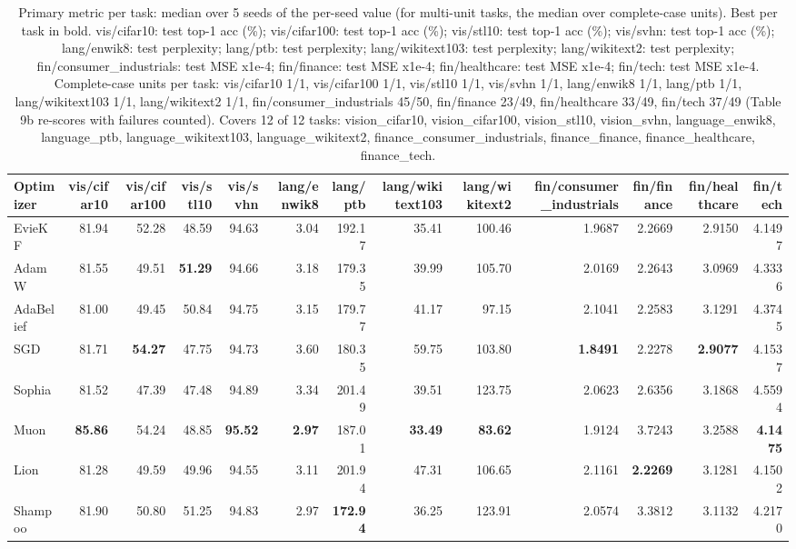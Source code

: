 \begin{table}[t]
\centering
\small
\caption{Primary metric per task: median over 5 seeds of the per-seed value (for multi-unit tasks, the median over complete-case units). Best per task in bold. vis/cifar10: test top-1 acc (\%); vis/cifar100: test top-1 acc (\%); vis/stl10: test top-1 acc (\%); vis/svhn: test top-1 acc (\%); lang/enwik8: test perplexity; lang/ptb: test perplexity; lang/wikitext103: test perplexity; lang/wikitext2: test perplexity; fin/consumer\_industrials: test MSE x1e-4; fin/finance: test MSE x1e-4; fin/healthcare: test MSE x1e-4; fin/tech: test MSE x1e-4. Complete-case units per task: vis/cifar10 1/1, vis/cifar100 1/1, vis/stl10 1/1, vis/svhn 1/1, lang/enwik8 1/1, lang/ptb 1/1, lang/wikitext103 1/1, lang/wikitext2 1/1, fin/consumer\_industrials 45/50, fin/finance 23/49, fin/healthcare 33/49, fin/tech 37/49 (Table 9b re-scores with failures counted). Covers 12 of 12 tasks: vision\_cifar10, vision\_cifar100, vision\_stl10, vision\_svhn, language\_enwik8, language\_ptb, language\_wikitext103, language\_wikitext2, finance\_consumer\_industrials, finance\_finance, finance\_healthcare, finance\_tech.}
\label{tab:table1_main_results}
\begin{tabular}{lrrrrrrrrrrrr}
\toprule
Optimizer & vis/cifar10 & vis/cifar100 & vis/stl10 & vis/svhn & lang/enwik8 & lang/ptb & lang/wikitext103 & lang/wikitext2 & fin/consumer\_industrials & fin/finance & fin/healthcare & fin/tech \\
\midrule
EvieKF & 81.94 & 52.28 & 48.59 & 94.63 & 3.04 & 192.17 & 35.41 & 100.46 & 1.9687 & 2.2669 & 2.9150 & 4.1497 \\
AdamW & 81.55 & 49.51 & \textbf{51.29} & 94.66 & 3.18 & 179.35 & 39.99 & 105.70 & 2.0169 & 2.2643 & 3.0969 & 4.3336 \\
AdaBelief & 81.00 & 49.45 & 50.84 & 94.75 & 3.15 & 179.77 & 41.17 & 97.15 & 2.1041 & 2.2583 & 3.1291 & 4.3745 \\
SGD & 81.71 & \textbf{54.27} & 47.75 & 94.73 & 3.60 & 180.35 & 59.75 & 103.80 & \textbf{1.8491} & 2.2278 & \textbf{2.9077} & 4.1537 \\
Sophia & 81.52 & 47.39 & 47.48 & 94.89 & 3.34 & 201.49 & 39.51 & 123.75 & 2.0623 & 2.6356 & 3.1868 & 4.5594 \\
Muon & \textbf{85.86} & 54.24 & 48.85 & \textbf{95.52} & \textbf{2.97} & 187.01 & \textbf{33.49} & \textbf{83.62} & 1.9124 & 3.7243 & 3.2588 & \textbf{4.1475} \\
Lion & 81.28 & 49.59 & 49.96 & 94.55 & 3.11 & 201.94 & 47.31 & 106.65 & 2.1161 & \textbf{2.2269} & 3.1281 & 4.1502 \\
Shampoo & 81.90 & 50.80 & 51.25 & 94.83 & 2.97 & \textbf{172.94} & 36.25 & 123.91 & 2.0574 & 3.3812 & 3.1132 & 4.2170 \\
\bottomrule
\end{tabular}
\end{table}
